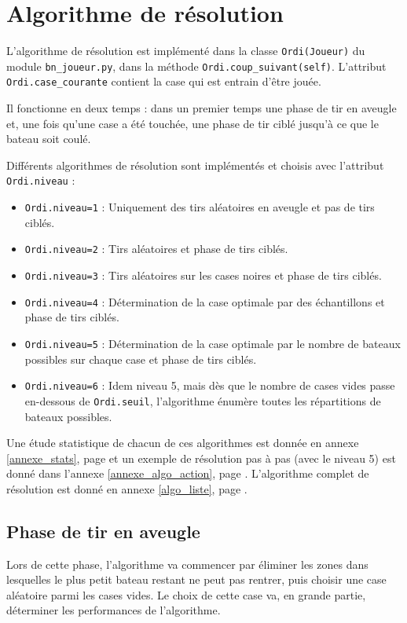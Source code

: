 \chapter{Algorithme de résolution}





L'algorithme de résolution est implémenté dans la classe \texttt{Ordi(Joueur)} du module \texttt{bn\_joueur.py}, dans la méthode \texttt{Ordi.coup\_suivant(self)}. L'attribut \texttt{Ordi.case\_courante} contient la case qui est entrain d'être jouée.

Il fonctionne en deux temps : dans un premier temps une phase de tir en aveugle et, une fois qu'une case a été touchée, une phase de tir ciblé jusqu'à ce que le bateau soit coulé.

Différents algorithmes de résolution sont implémentés et choisis avec l'attribut \texttt{Ordi.niveau} :
\begin{itemize}
\item \texttt{Ordi.niveau=1} : Uniquement des tirs aléatoires en aveugle et pas de tirs ciblés.
\item \texttt{Ordi.niveau=2} : Tirs aléatoires et phase de tirs ciblés.
\item \texttt{Ordi.niveau=3} : Tirs aléatoires sur les cases noires  et phase de tirs ciblés.
\item \texttt{Ordi.niveau=4} : Détermination de la case optimale par des échantillons et phase de tirs ciblés.
\item \texttt{Ordi.niveau=5} : Détermination de la case optimale par le nombre de bateaux possibles sur chaque case et phase de tirs ciblés.
\item \texttt{Ordi.niveau=6} : Idem niveau 5, mais dès que le nombre de cases vides passe en-dessous de \texttt{Ordi.seuil}, l'algorithme énumère toutes les répartitions de bateaux possibles.
\end{itemize}

Une étude statistique de chacun de ces algorithmes est donnée en annexe \ref{annexe_stats}, page \pageref{annexe_stats} et un exemple de résolution pas à pas (avec le niveau 5) est donné dans l'annexe \ref{annexe_algo_action}, page \pageref{annexe_algo_action}. L'algorithme complet de résolution est donné en annexe \ref{algo_liste}, page \pageref{algo_resolution}.




\section{Phase de tir en aveugle}
Lors de cette phase, l'algorithme va commencer par éliminer les zones dans lesquelles le plus petit bateau restant ne peut pas rentrer, puis choisir une case aléatoire parmi les cases vides. Le choix de cette case va, en grande partie, déterminer les performances de l'algorithme.

